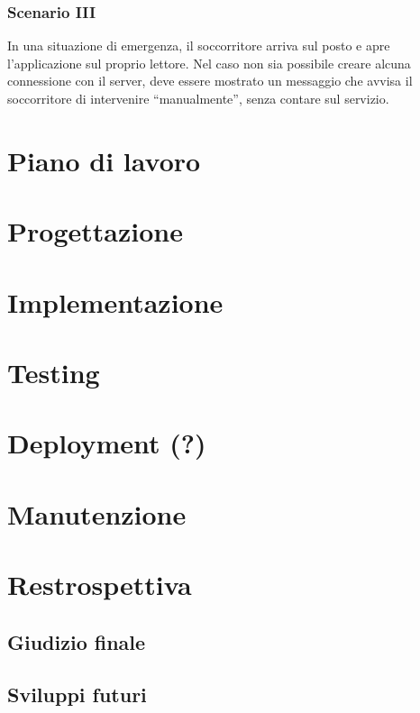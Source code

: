 \documentclass[a4paper,12pt]{report}
\begin{document}
\subsection{Scenario III} 
In una situazione di emergenza, il soccorritore arriva sul posto e apre l'applicazione sul proprio lettore. Nel caso non sia possibile creare alcuna connessione con il server, deve essere mostrato un messaggio che avvisa il soccorritore di intervenire ``manualmente'', senza contare sul servizio.



\chapter{Piano di lavoro}

\chapter{Progettazione}

\chapter{Implementazione}

\chapter{Testing} 

\chapter{Deployment (?)}

\chapter{Manutenzione}

\chapter{Restrospettiva}
\section{Giudizio finale}
\section{Sviluppi futuri}

 
\end{document}
